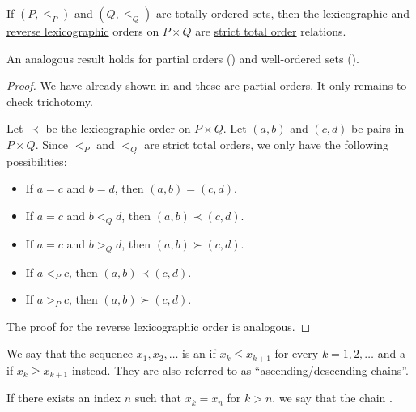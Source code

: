 \begin{proposition}\label{thm:total_lexicographic_order_is_total_order}
  If \( (P, \leq_P) \) and \( (Q, \leq_Q) \) are \hyperref[def:totally_ordered_set]{totally ordered sets}, then the \hyperref[eq:def:lexicographic_order]{lexicographic} and \hyperref[eq:def:lexicographic_order/reverse]{reverse lexicographic} orders on \( P \times Q \) are \hyperref[def:totally_ordered_set]{strict total order} relations.
\end{proposition}
\begin{comments}
  \item An analogous result holds for partial orders () and well-ordered sets ().
\end{comments}
\begin{proof}
  We have already shown in  and these are partial orders. It only remains to check trichotomy.

   Let \( \prec \) be the lexicographic order on \( P \times Q \). Let \( (a, b) \) and \( (c, d) \) be pairs in \( P \times Q \). Since \( <_P \) and \( <_Q \) are strict total orders, we only have the following possibilities:
  \begin{itemize}
    \item If \( a = c \) and \( b = d \), then \( (a, b) = (c, d) \).
    \item If \( a = c \) and \( b <_Q d \), then \( (a, b) \prec (c, d) \).
    \item If \( a = c \) and \( b >_Q d \), then \( (a, b) \succ (c, d) \).
    \item If \( a <_P c \), then \( (a, b) \prec (c, d) \).
    \item If \( a >_P c \), then \( (a, b) \succ (c, d) \).
  \end{itemize}

  The proof for the reverse lexicographic order is analogous.
\end{proof}

\begin{definition}\label{def:stabilizing_chain}\mimprovised
  We say that the \hyperref[def:sequence]{sequence} \( x_1, x_2, \ldots \) is an  if \( x_k \leq x_{k+1} \) for every \( k = 1, 2, \ldots \) and a  if \( x_k \geq x_{k+1} \) instead. They are also referred to as \enquote{ascending/descending chains}.

  If there exists an index \( n \) such that \( x_k = x_n \) for \( k > n \). we say that the chain .
\end{definition}


